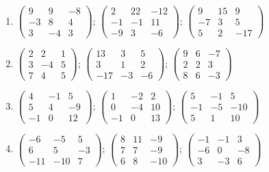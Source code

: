 \begin{enumerate}[label=\arabic*., leftmargin=*, itemsep=1pt]
\item $\left(\begin{smallmatrix}9 & 9 & -8\\ -3 & 8 & 4\\ 3 & -4 & 3\end{smallmatrix}\right)$; $\left(\begin{smallmatrix}2 & 22 & -12\\ -1 & -1 & 11\\ -9 & 3 & -6\end{smallmatrix}\right)$; $\left(\begin{smallmatrix}9 & 15 & 9\\ -7 & 3 & 5\\ 5 & 2 & -17\end{smallmatrix}\right)$
\item $\left(\begin{smallmatrix}2 & 2 & 1\\ 3 & -4 & 5\\ 7 & 4 & 5\end{smallmatrix}\right)$; $\left(\begin{smallmatrix}13 & 3 & 5\\ 3 & 1 & 2\\ -17 & -3 & -6\end{smallmatrix}\right)$; $\left(\begin{smallmatrix}9 & 6 & -7\\ 2 & 2 & 3\\ 8 & 6 & -3\end{smallmatrix}\right)$
\item $\left(\begin{smallmatrix}4 & -1 & 5\\ 5 & 4 & -9\\ -1 & 0 & 12\end{smallmatrix}\right)$; $\left(\begin{smallmatrix}1 & -2 & 2\\ 0 & -4 & 10\\ -1 & 0 & 13\end{smallmatrix}\right)$; $\left(\begin{smallmatrix}5 & -1 & 5\\ -1 & -5 & -10\\ 5 & 1 & 10\end{smallmatrix}\right)$
\item $\left(\begin{smallmatrix}-6 & -5 & 5\\ 6 & 5 & -3\\ -11 & -10 & 7\end{smallmatrix}\right)$; $\left(\begin{smallmatrix}8 & 11 & -9\\ 7 & 7 & -9\\ 6 & 8 & -10\end{smallmatrix}\right)$; $\left(\begin{smallmatrix}-1 & -1 & 3\\ -6 & 0 & -8\\ 3 & -3 & 6\end{smallmatrix}\right)$

\end{enumerate}
